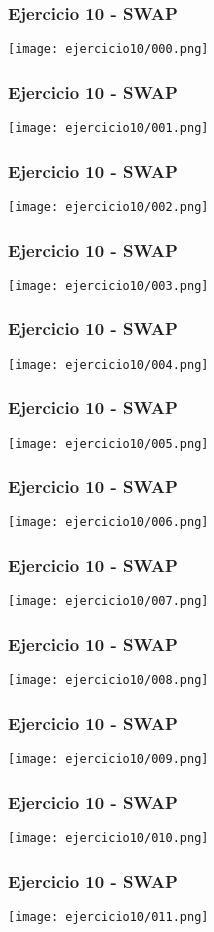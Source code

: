 \documentclass{beamer}
\begin{document}
\begin{frame}
\frametitle{Ejercicio 10 - SWAP}
\texttt{[image: ejercicio10/000.png]}
\end{frame}

\begin{frame}
\frametitle{Ejercicio 10 - SWAP}
\texttt{[image: ejercicio10/001.png]}
\end{frame}

\begin{frame}
\frametitle{Ejercicio 10 - SWAP}
\texttt{[image: ejercicio10/002.png]}
\end{frame}

\begin{frame}
\frametitle{Ejercicio 10 - SWAP}
\texttt{[image: ejercicio10/003.png]}
\end{frame}

\begin{frame}
\frametitle{Ejercicio 10 - SWAP}
\texttt{[image: ejercicio10/004.png]}
\end{frame}

\begin{frame}
\frametitle{Ejercicio 10 - SWAP}
\texttt{[image: ejercicio10/005.png]}
\end{frame}

\begin{frame}
\frametitle{Ejercicio 10 - SWAP}
\texttt{[image: ejercicio10/006.png]}
\end{frame}

\begin{frame}
\frametitle{Ejercicio 10 - SWAP}
\texttt{[image: ejercicio10/007.png]}
\end{frame}

\begin{frame}
\frametitle{Ejercicio 10 - SWAP}
\texttt{[image: ejercicio10/008.png]}
\end{frame}

\begin{frame}
\frametitle{Ejercicio 10 - SWAP}
\texttt{[image: ejercicio10/009.png]}
\end{frame}

\begin{frame}
\frametitle{Ejercicio 10 - SWAP}
\texttt{[image: ejercicio10/010.png]}
\end{frame}

\begin{frame}
\frametitle{Ejercicio 10 - SWAP}
\texttt{[image: ejercicio10/011.png]}
\end{frame}
\end{document}
